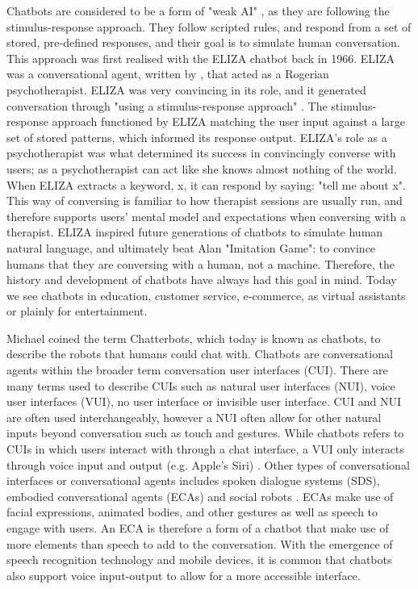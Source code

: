 Chatbots are considered to be a form of "weak AI" \citep{DeAngeli2008}, as they are following the stimulus-response approach. They follow scripted rules, and respond from a set of stored, pre-defined responses, and their goal is to simulate human conversation. This approach was first realised with the ELIZA chatbot back in 1966. ELIZA was a conversational agent, written by \cite{Weizenbaum1966}, that acted as a Rogerian psychotherapist. ELIZA was very convincing in its role, and it generated conversation through "using a stimulus-response approach" \citep[: 57]{McTear2016b}. The stimulus-response approach functioned by ELIZA matching the user input against a large set of stored patterns, which informed its response output. ELIZA's role as a psychotherapist was what determined its success in convincingly converse with users; as a psychotherapist can act like she knows almost nothing of the world. When ELIZA extracts a keyword, x, it can respond by saying: "tell me about x". This way of conversing is familiar to how therapist sessions are usually run, and therefore supports users' mental model and expectations when conversing with a therapist. ELIZA inspired future generations of chatbots to simulate human natural language, and ultimately beat Alan \cite{Turing1950} "Imitation Game": to convince humans that they are conversing with a human, not a machine. Therefore, the history and development of chatbots have always had this goal in mind. Today we see chatbots in education, customer service, e-commerce, as virtual assistants or plainly for entertainment. 

Michael \cite{Mauldin1994} coined the term Chatterbots, which today is known as chatbots, to describe the robots that humans could chat with. Chatbots are conversational agents within the broader term conversation user interfaces (CUI). There are many terms used to describe CUIs such as natural user interfaces (NUI), voice user interfaces (VUI), no user interface or invisible user interface.  CUI and NUI are often used interchangeably, however a NUI often allow for other natural inputs beyond conversation such as touch and gestures. While chatbots refers to CUIs in which users interact with through a chat interface, a VUI only interacts through voice input and output (e.g. Apple's Siri) \citep{Pearl2017}. Other types of conversational interfaces or conversational agents includes spoken dialogue systems (SDS), embodied conversational agents (ECAs) and social robots \citep{McTear2016b}. ECAs make use of facial expressions, animated bodies, and other gestures as well as speech to engage with users. An ECA is therefore a form of a chatbot that make use of more elements than speech to add to the conversation. With the emergence of speech recognition technology and mobile devices, it is common that chatbots also support voice input-output to allow for a more accessible interface.

